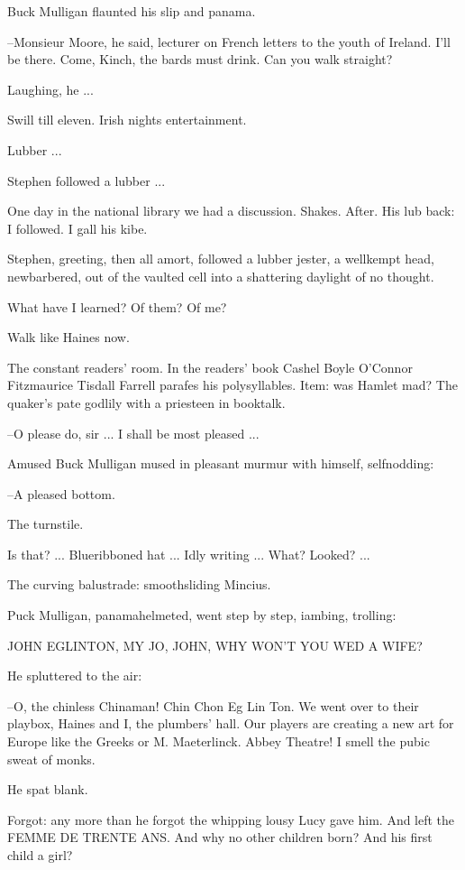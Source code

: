 Buck Mulligan flaunted his slip and panama.

--Monsieur Moore, he said, lecturer on French letters to the youth of Ireland. I'll be there. Come, Kinch, the bards must drink. Can you walk straight?

Laughing, he ...

Swill till eleven. Irish nights entertainment.

Lubber ...

Stephen followed a lubber ...

One day in the national library we had a discussion. Shakes. After. His lub back: I followed. I gall his kibe.

Stephen, greeting, then all amort, followed a lubber jester, a wellkempt head, newbarbered, out of the vaulted cell into a shattering daylight of no thought.

What have I learned? Of them? Of me?

Walk like Haines now.

The constant readers' room. In the readers' book Cashel Boyle O'Connor Fitzmaurice Tisdall Farrell parafes his polysyllables. Item: was Hamlet mad? The quaker's pate godlily with a priesteen in booktalk.

--O please do, sir ... I shall be most pleased ...

Amused Buck Mulligan mused in pleasant murmur with himself, selfnodding:

--A pleased bottom.

The turnstile.

Is that? ... Blueribboned hat ... Idly writing ... What? Looked? ...

The curving balustrade: smoothsliding Mincius.

Puck Mulligan, panamahelmeted, went step by step, iambing, trolling:


    JOHN EGLINTON, MY JO, JOHN,
    WHY WON'T YOU WED A WIFE?


He spluttered to the air:

--O, the chinless Chinaman! Chin Chon Eg Lin Ton. We went over to their playbox, Haines and I, the plumbers' hall. Our players are creating a new art for Europe like the Greeks or M. Maeterlinck. Abbey Theatre! I smell the pubic sweat of monks.

He spat blank.

Forgot: any more than he forgot the whipping lousy Lucy gave him. And left the FEMME DE TRENTE ANS. And why no other children born? And his first child a girl?

